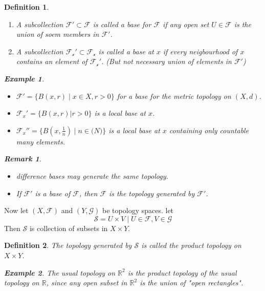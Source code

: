 \documentclass{article}
\newtheorem*{definition}{Definition}
\newtheorem*{remark}{Remark}
\newtheorem*{example}{Example}
\begin{document}
\begin{definition} \hfil
    \begin{enumerate}
        \item A subcollection $\mathcal{F}' \subset \mathcal{F}$ is called a base for $\mathcal{F}$
        if any open set $U \in \mathcal{F}$ is the union of soem members in $\mathcal{F}'$.
        \item A subcollection $\mathcal{F_x}' \subset \mathcal{F_x}$ is called a base at $x$ 
        if every neigbourhood of $x$ contains an element of $\mathcal{F_x}'$.
        (But not necessary union of elements in $\mathcal{F}'$)
    \end{enumerate}
    \begin{example} \hfill
        \begin{itemize}
            \item $\mathcal{F}' = \{B(x, r) \mid x \in X, r > 0\}$ for a base for the metric topology on $(X, d)$.
            \item $\mathcal{F}_x' = \{B(x, r)| r > 0\}$ is a local base at $x$.
            \item $\mathcal{F}_x''= \{B(x, \frac{1}{n}) \mid n \in \mathbb(N)\}$ is a local base at $x$ 
            containing only countable many elements.
        \end{itemize}
    \end{example}
    \begin{remark} \hfil
        \begin{itemize}
            \item difference bases may generate the same topology.
            \item If $\mathcal{F'}$ is a base of $\mathcal{F}$, then $\mathcal{F}$ is the topology generated by $\mathcal{F}'$.
        \end{itemize}
    \end{remark}
\end{definition}
Now let $(X, \mathcal{F})$ and $(Y, \mathcal{G})$ be topology spaces. let
\[
    \mathcal{S} = {U \times V \mid U \in \mathcal{F}, V \in \mathcal{G}}
\]
Then $\mathcal{S}$ is collection of subsets in $X \times Y$.
\begin{definition}
    The topology generated by $\mathcal{S}$ is called the product topology on $X \times Y$.
    \begin{example}
        The usual topology on $\mathbb{R}^2$ is the product topology of the usual topology on $\mathbb{R}$,
        since any open subset in $\mathbb{R}^2$ is the union of "open rectangles".
    \end{example}
\end{definition}
\end{document}
